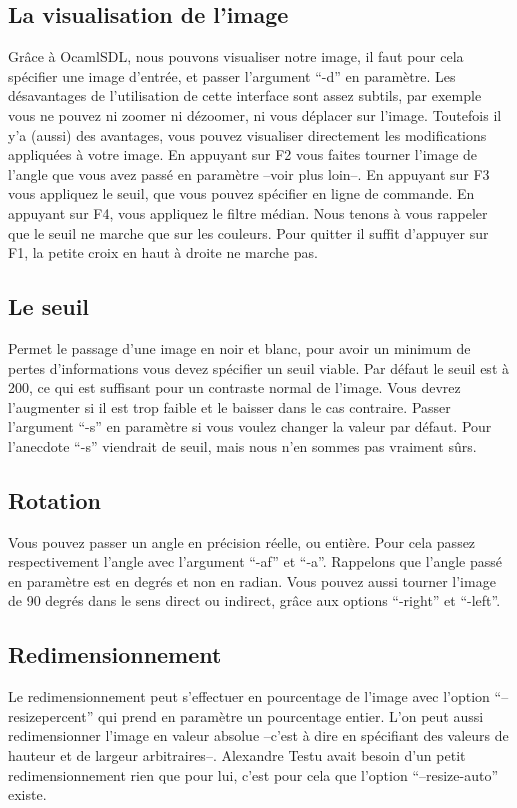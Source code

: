 \subsection{ La visualisation de l'image }
 Gr\^ace \`a OcamlSDL, nous pouvons visualiser notre image, il faut pour
 cela sp\'ecifier une image d'entr\'ee, et passer l'argument ``-d'' en
 param\`etre. Les d\'esavantages de l'utilisation de cette interface sont
 assez subtils, par exemple vous ne pouvez ni zoomer ni d\'ezoomer, ni
 vous d\'eplacer sur l'image. Toutefois il y'a (aussi) des avantages, vous pouvez
 visualiser directement les modifications appliqu\'ees \`a votre
 image. En appuyant sur F2 vous faites tourner l'image de l'angle que
 vous avez pass\'e en param\`etre --voir plus loin--. En appuyant sur F3
 vous appliquez le seuil, que vous pouvez sp\'ecifier en ligne de
 commande. En appuyant sur F4, vous appliquez le filtre m\'edian. Nous
 tenons \`a vous rappeler que le seuil ne marche que sur les couleurs.
 Pour quitter il suffit d'appuyer sur F1, la petite croix en haut \`a
 droite ne marche pas.
\subsection{ Le seuil }
 Permet le passage d'une image en noir et blanc, pour avoir un minimum
 de pertes d'informations vous devez sp\'ecifier un seuil viable. Par
 d\'efaut le seuil est \`a 200, ce qui est suffisant pour un contraste
 normal de l'image. Vous devrez l'augmenter si il est trop faible et le
 baisser dans le cas contraire. Passer l'argument ``-s'' en
 param\`etre si vous voulez changer la valeur par d\'efaut. Pour
 l'anecdote ``-s'' viendrait de seuil, mais nous n'en sommes pas vraiment
 s\^urs.
\subsection{ Rotation }
 Vous pouvez passer un angle en pr\'ecision r\'eelle, ou enti\`ere. Pour
 cela passez respectivement l'angle avec l'argument ``-af'' et ``-a''.
 Rappelons que l'angle pass\'e en param\`etre est en degr\'es et non en
 radian. Vous pouvez aussi tourner l'image de 90 degr\'es dans le sens
 direct ou indirect, gr\^ace aux options ``-right'' et ``-left''.
\subsection{ Redimensionnement }
 Le redimensionnement peut s'effectuer en pourcentage de l'image avec
 l'option ``--resizepercent'' qui prend en param\`etre un pourcentage
 entier. L'on peut aussi redimensionner l'image en valeur absolue
 --c'est \`a dire en sp\'ecifiant des valeurs de hauteur et de largeur
 arbitraires--. Alexandre Testu avait besoin d'un petit redimensionnement
 rien que pour lui, c'est pour cela que l'option ``--resize-auto''
 existe.

